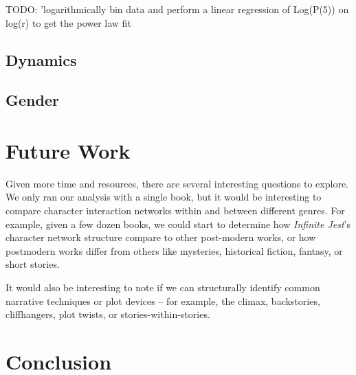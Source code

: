 \documentclass[12pt]{article}
\newcommand{\infinitejest}{{\em Infinite Jest}\xspace}
\begin{document}
TODO: 'logarithmically bin data and perform a linear regression of Log(P(5)) on log(r) to get the power law fit


\subsection*{Dynamics}

\subsection*{Gender}

\section*{Future Work}

Given more time and resources, there are several interesting questions to explore. We only ran our analysis with a single book, but it would be interesting to compare character interaction networks within and between different genres. For example, given a few dozen books, we could start to determine how \infinitejest's character network structure compare to other post-modern works, or how postmodern works differ from others like mysteries, historical fiction, fantasy, or short stories.

It would also be interesting to note if we can structurally identify common narrative techniques or plot devices -- for example, the climax, backstories, cliffhangers, plot twists, or stories-within-stories.

\section*{Conclusion}



\end{document}
